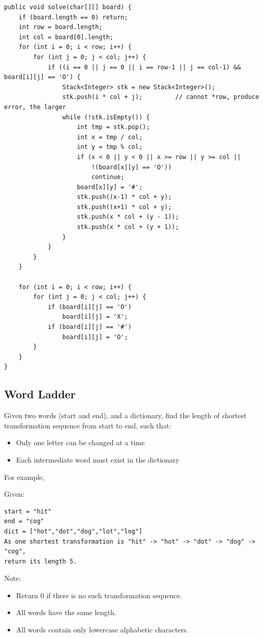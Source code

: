\documentclass[12pt]{book}
\begin{document}
\lstset{language=java,label= ,caption= ,numbers=none}
\begin{lstlisting}
public void solve(char[][] board) {
    if (board.length == 0) return;
    int row = board.length;
    int col = board[0].length;
    for (int i = 0; i < row; i++) {
        for (int j = 0; j < col; j++) {
            if ((i == 0 || j == 0 || i == row-1 || j == col-1) && board[i][j] == 'O') {
                Stack<Integer> stk = new Stack<Integer>();
                stk.push(i * col + j);         // cannot *row, produce error, the larger 
                while (!stk.isEmpty()) {
                    int tmp = stk.pop();
                    int x = tmp / col;
                    int y = tmp % col;
                    if (x < 0 || y < 0 || x >= row || y >= col ||
                        !(board[x][y] == 'O'))
                        continue;
                    board[x][y] = '#';
                    stk.push((x-1) * col + y);
                    stk.push((x+1) * col + y);
                    stk.push(x * col + (y - 1));
                    stk.push(x * col + (y + 1));
                }
            }
        }
    }

    for (int i = 0; i < row; i++) {
        for (int j = 0; j < col; j++) {
            if (board[i][j] == 'O')
                board[i][j] = 'X';
            if (board[i][j] == '#')
                board[i][j] = 'O';
        }
    }
}
\end{lstlisting}

\subsection{Word Ladder}
\label{sec-10-1-2}
Given two words (start and end), and a dictionary, find the length of shortest transformation sequence from start to end, such that:
\begin{itemize}
\item Only one letter can be changed at a time
\item Each intermediate word must exist in the dictionary
\end{itemize}
For example,

Given:
\lstset{language=java,label= ,caption= ,numbers=none}
\begin{lstlisting}
start = "hit"
end = "cog"
dict = ["hot","dot","dog","lot","log"]
As one shortest transformation is "hit" -> "hot" -> "dot" -> "dog" -> "cog",
return its length 5.
\end{lstlisting}
Note:
\begin{itemize}
\item Return 0 if there is no such transformation sequence.
\item All words have the same length.
\item All words contain only lowercase alphabetic characters.
\end{itemize}
\end{document}

